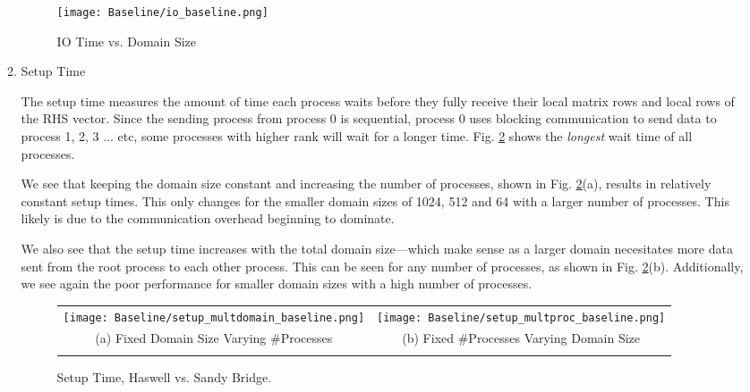 \begin{enumerate}
\begin{enumerate}
	
 \begin{figure}[h] %
 	\begin{center}
  		\texttt{[image: Baseline/io\_baseline.png]} %
  		\caption{IO Time vs. Domain Size}
  		\label{fig:IO}
  	\end{center}
 \end{figure}

	\item Setup Time

	The setup time measures the amount of time each process waits before they fully receive their local matrix rows and local rows of the RHS vector. Since the sending process from process 0 is sequential, process 0 uses blocking communication to send data to process 1, 2, 3 ... etc, some processes with higher rank will wait for a longer time. Fig. \ref{fig:setup} shows the \textit{longest} wait time of all processes. 
	
	We see that keeping the domain size constant and increasing the number of processes, shown in Fig. \ref{fig:setup}(a), results in relatively constant setup times. This only changes for the smaller domain sizes of 1024, 512 and 64 with a larger number of processes. This likely is due to the communication overhead beginning to dominate.
	
 We also see that the setup time increases with the total domain size---which make sense as a larger domain necesitates more data sent from the root process to each other process. This can be seen for any number of processes, as shown in Fig. \ref{fig:setup}(b). Additionally, we see again the poor performance for smaller domain sizes with a high number of processes.
	
	
	\begin{figure}[h] %
		\hspace*{-0.25\linewidth}\begin{tabular}{cc}
			\texttt{[image: Baseline/setup\_multdomain\_baseline.png]} & \texttt{[image: Baseline/setup\_multproc\_baseline.png]} \\
		    (a) Fixed Domain Size Varying \#Processes & (b) Fixed \#Processes Varying Domain Size\\[6pt]\\
		\end{tabular}
		\caption{Setup Time, Haswell vs. Sandy Bridge.}
		\label{fig:setup}
	\end{figure}
	

\end{enumerate}
\end{enumerate}
